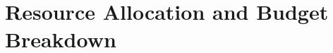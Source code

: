 \chapter{Resource Allocation and Budget Breakdown}\label{chap:baseline_resource_allocation_budget_breakdown}